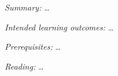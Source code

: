\emph{Summary:}
\dots

\emph{Intended learning outcomes:}
\dots

\emph{Prerequisites:}
\dots

\emph{Reading:}
\dots
